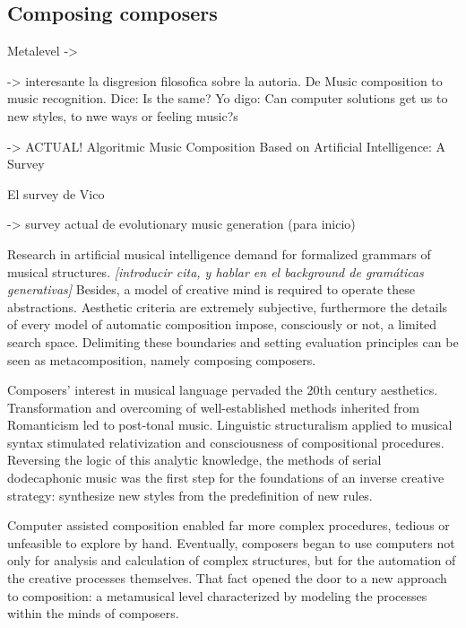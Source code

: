 \documentclass{article}
\begin{document}
\subsection{Composing composers}


{\color{red}
Metalevel -> \cite{DBLP:journals/aim/Buchanan01}



\cite{JACOB1996} -> interesante la disgresion filosofica sobre la autoria. De Music composition to music recognition. Dice: Is the same? Yo digo: Can computer solutions get us to new styles, to nwe ways or feeling music?s


\cite{LopezRincon2018} -> ACTUAL! Algoritmic Music Composition Based on
Artificial Intelligence: A Survey

El survey de Vico \cite{DBLP:journals/corr/RodriguezV14}


\cite{Dostl2013} -> survey actual de evolutionary music generation (para inicio)
}


Research in artificial musical intelligence demand for formalized
grammars of musical structures. {\color{gray} \textsl{[introducir cita, y hablar en el background de gramáticas generativas]}} Besides, a model of creative
mind is required to operate these abstractions.
Aesthetic criteria are extremely subjective, furthermore the details
of every model of automatic composition impose, consciously
or not, a limited search space. Delimiting these
boundaries and setting evaluation principles can be seen as
metacomposition, namely composing composers.

Composers' interest in musical language pervaded the 20th
century aesthetics. Transformation and overcoming of well-established methods
inherited from Romanticism led to post-tonal
music. Linguistic structuralism applied to musical
syntax stimulated relativization and consciousness of
compositional procedures. Reversing the logic of this analytic knowledge, the methods
of serial dodecaphonic music was the first step for the foundations of
an inverse creative strategy: synthesize new styles from the predefinition of new rules. 

Computer assisted composition enabled
far more complex procedures, tedious or unfeasible to explore by hand. Eventually, composers began to use computers not only for analysis and calculation of complex structures, but for the automation of the creative processes themselves. That fact opened the door to a new approach to composition: a metamusical level characterized by modeling the processes within the minds of composers. 
\end{document}
